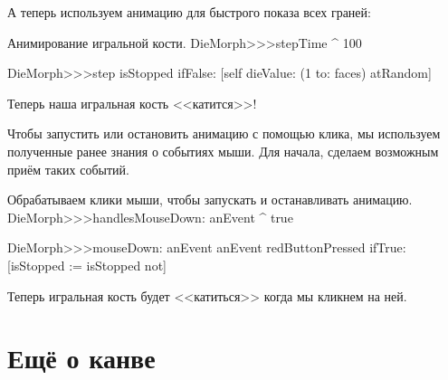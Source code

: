 \documentclass[a4paper,10pt,twoside]{book}
\begin{document}
А теперь используем анимацию для быстрого показа всех граней:
\begin{methods}{Анимирование игральной кости.}
DieMorph>>>stepTime
	^ 100

DieMorph>>>step
	isStopped ifFalse: [self dieValue: (1 to: faces) atRandom]
\end{methods}
Теперь наша игральная кость <<катится>>!

Чтобы запустить или остановить анимацию с помощью клика, мы используем полученные ранее знания о событиях мыши.
Для начала, сделаем возможным приём таких событий.

\begin{methods}{Обрабатываем клики мыши, чтобы запускать и останавливать анимацию.}
DieMorph>>>handlesMouseDown: anEvent
	^ true

DieMorph>>>mouseDown: anEvent
	anEvent redButtonPressed
		ifTrue: [isStopped := isStopped not]
\end{methods}
Теперь игральная кость будет <<катиться>> когда мы кликнем на ней.



\section{Ещё о канве}
\end{document}
